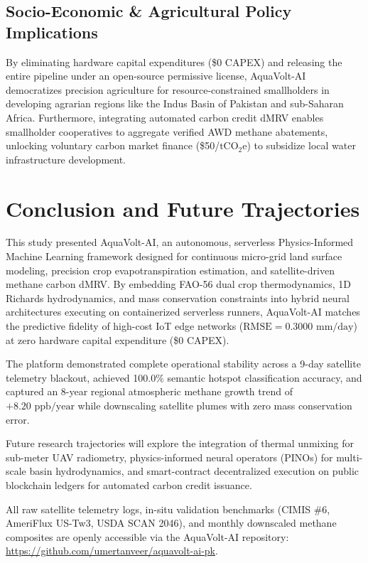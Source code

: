 \documentclass[sn-mathphys-num,Numbered]{sn-jnl}
\begin{document}
\subsection{Socio-Economic \& Agricultural Policy Implications}\label{sec:disc_policy}
By eliminating hardware capital expenditures (\$0 CAPEX) and releasing the entire pipeline under an open-source permissive license, AquaVolt-AI democratizes precision agriculture for resource-constrained smallholders in developing agrarian regions like the Indus Basin of Pakistan and sub-Saharan Africa. Furthermore, integrating automated carbon credit dMRV enables smallholder cooperatives to aggregate verified AWD methane abatements, unlocking voluntary carbon market finance (\$50/$\text{tCO}_2\text{e}$) to subsidize local water infrastructure development.

\section{Conclusion and Future Trajectories}\label{sec:conclusion}
This study presented AquaVolt-AI, an autonomous, serverless Physics-Informed Machine Learning framework designed for continuous micro-grid land surface modeling, precision crop evapotranspiration estimation, and satellite-driven methane carbon dMRV. By embedding FAO-56 dual crop thermodynamics, 1D Richards hydrodynamics, and mass conservation constraints into hybrid neural architectures executing on containerized serverless runners, AquaVolt-AI matches the predictive fidelity of high-cost IoT edge networks ($\mathrm{RMSE} = 0.3000\text{ mm/day}$) at zero hardware capital expenditure (\$0 CAPEX). 

The platform demonstrated complete operational stability across a 9-day satellite telemetry blackout, achieved 100.0\% semantic hotspot classification accuracy, and captured an 8-year regional atmospheric methane growth trend of $+8.20\text{ ppb/year}$ while downscaling satellite plumes with zero mass conservation error. 

Future research trajectories will explore the integration of thermal unmixing for sub-meter UAV radiometry, physics-informed neural operators (PINOs) for multi-scale basin hydrodynamics, and smart-contract decentralized execution on public blockchain ledgers for automated carbon credit issuance.

\backmatter

All raw satellite telemetry logs, in-situ validation benchmarks (CIMIS \#6, AmeriFlux US-Tw3, USDA SCAN 2046), and monthly downscaled methane composites are openly accessible via the AquaVolt-AI repository: \url{https://github.com/umertanveer/aquavolt-ai-pk}.
\end{document}
